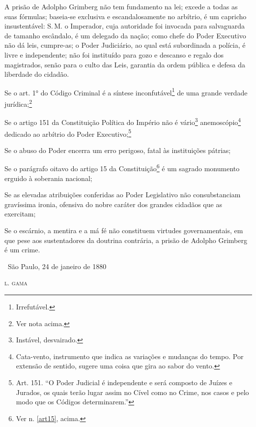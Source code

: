 A prisão de Adolpho Grimberg não tem fundamento na lei; excede a todas
as suas fórmulas; baseia-se exclusiva e escandalosamente no arbítrio, é
um capricho insustentável: S.\,M. o Imperador, cuja autoridade foi
invocada para salvaguarda de tamanho escândalo, é um delegado da nação;
como chefe do Poder Executivo não dá leis, cumpre-as; o Poder
Judiciário, ao qual está subordinada a polícia, é livre e independente;
não foi instituído para gozo e descanso e regalo dos magistrados, senão
para o culto das Leis, garantia da ordem pública e defesa da liberdade
do cidadão.

\asterisc

Se o art. 1° do Código Criminal é a síntese inconfutável\footnote{
  Irrefutável.} de uma grande verdade jurídica;\footnote{Ver nota
  acima.} %

Se o artigo 151 da Constituição Política do Império não é
vário\footnote{Instável, desvairado.} anemoscópio\footnote{
  Cata-vento, instrumento que indica as variações e mudanças do tempo.
  Por extensão de sentido, sugere uma coisa que gira ao sabor do vento.}
dedicado ao arbítrio do Poder Executivo;\footnote{Art. 151. ``O Poder
  Judicial é independente e será composto de Juízes e Jurados, os
  quais terão lugar assim no Cível como no Crime, nos casos e pelo modo
  que os Códigos determinarem.''}

Se o abuso do Poder encerra um erro perigoso, fatal às instituições
pátrias; %

Se o parágrafo oitavo do artigo 15 da Constituição\footnote{Ver n. \ref{art15}, acima.} é um sagrado
monumento erguido à soberania nacional;

Se as elevadas atribuições conferidas ao Poder Legislativo não
consubstanciam gravíssima ironia, ofensiva do nobre caráter dos grandes
cidadãos que as exercitam;

Se o escárnio, a mentira e a má fé não constituem virtudes
governamentais, em que pese aos sustentadores da doutrina contrária, a
prisão de Adolpho Grimberg é um crime.\medskip
{}

\hfill\ São Paulo, 24 de janeiro de 1880

\hfill\textsc{l. gama}


